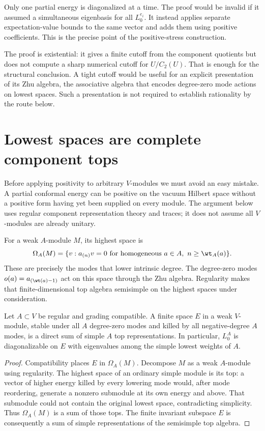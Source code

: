 Only one partial energy is diagonalized at a time. The proof would be
invalid if it assumed a simultaneous eigenbasis for all $L^{e_i}_0$.
It instead applies separate expectation-value bounds to the same vector
and adds them using positive coefficients. This is the precise point
of the positive-stress construction.

The proof is existential: it gives a finite cutoff from the component
quotients but does not compute a sharp numerical cutoff for $U/C_2(U)$.
That is enough for the structural conclusion. A tight cutoff would be
useful for an explicit presentation of its Zhu algebra, the associative
algebra that encodes degree-zero mode actions on lowest spaces. Such a
presentation is not required to establish rationality by the route below.

\section{Lowest spaces are complete component tops}

Before applying positivity to arbitrary $V$-modules we must avoid an
easy mistake. A partial conformal energy can be positive on the vacuum
Hilbert space without a positive form having yet been supplied on every
module. The argument below uses regular component representation theory
and traces; it does not assume all $V$-modules are already unitary.

For a weak $A$-module $M$, its highest space is
\[
 \Omega_A(M)=\{v:a_{(n)}v=0\text{ for homogeneous }a\in A,
                                  \ n\geq\wt_A(a)\}.
\]
These are precisely the modes that lower intrinsic degree. The
degree-zero modes $o(a)=a_{(\wt(a)-1)}$ act on this space through
the Zhu algebra. Regularity makes that finite-dimensional top algebra
semisimple on the highest spaces under consideration.

\begin{lemma}\label{lem:c-compatible-tops}
Let $A\subset V$ be regular and grading compatible. A finite space
$E$ in a weak $V$-module, stable under all $A$ degree-zero modes and
killed by all negative-degree $A$ modes, is a direct sum of simple
$A$ top representations. In particular, $L^A_0$ is diagonalizable on
$E$ with eigenvalues among the simple lowest weights of $A$.
\end{lemma}
\begin{proof}
Compatibility places $E$ in $\Omega_A(M)$. Decompose $M$ as a weak
$A$-module using regularity. The highest space of an ordinary simple
module is its top: a vector of higher energy killed by every lowering
mode would, after mode reordering, generate a nonzero submodule
at its own energy and above. That submodule could not contain the
original lowest space, contradicting simplicity.
Thus $\Omega_A(M)$ is a sum of those tops. The
finite invariant subspace $E$ is consequently a sum of simple
representations of the semisimple top algebra.
\end{proof}

